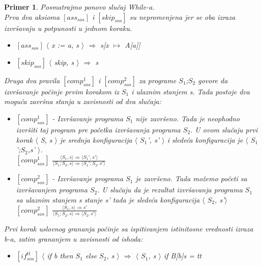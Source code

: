 \documentclass[a4paper]{article}
\newtheorem{primer}{Primer}[section]
\begin{document}
{\begin{primer} Posmatrajmo ponovo slučaj \textit{While-a}.\\
Prva dva aksioma $[ass_{sos}]$ i $[skip_{sos}]$  su nepromenjena jer se oba izraza izvršavaju u potpunosti u jednom koraku.
\begin{itemize}
	\item $[ass_{sos}]$ \hspace{1cm} $\langle$ \textit{x := a, s} $\rangle$ $\Longrightarrow$ \textit{s}[\textit{x $\mapsto$ A}[\textit{a}]]
	\item $[skip_{sos}]$ \hspace{1cm} $\langle$ skip, \textit{s} $\rangle$ $\Longrightarrow$ \textit{s}
\end{itemize} 
Druga dva pravila $[comp^{1}_{sos}]$ i $[comp^{2}_{sos}]$ za programe $S_1$;$S_2$ govore da izvršavanje počinje prvim korakom iz $S_1$ i ulaznim stanjem s. Tada postoje dva moguća završna stanja u zavisnosti od dva slučaja:
\begin{itemize}
	\item $[comp^{1}_{sos}]$ - Izvršavanje programa $S_1$ nije završeno. Tada je neophodno izvršiti taj program pre početka izvršavanja programa $S_2$. U ovom slučaju prvi korak $\langle$ \textit{S, s} $\rangle$ je srednja konfiguracija  $\langle$ \textit{$S_1$', s'} $\rangle$ i sledeća konfiguracija je  $\langle$ \textit{$S_1$';$S_2$,s'} $\rangle$.\\
	$[comp^1_{sos}]$ \hspace{1cm} {\large $\frac{\langle S_1, s \rangle \Longrightarrow \langle S_1', s' \rangle}{\langle S_1;S_2,s \rangle \Longrightarrow \langle S_1';S_2,s' \rangle}$}
	\item $[comp^2_{sos}]$ - Izvršavanje programa $S_1$  je završeno. Tada možemo početi sa izvršavanjem programa $S_2$. U slučaju da je rezultat izvršavanja programa $S_1$ sa ulaznim stanjem s stanje s' tada je sledeća konfiguracija $\langle$ $S_2$, s'$\rangle$ \\
	$[comp^2_{sos}]$ \hspace{1cm}  {\large $\frac{\langle S_1, s \rangle \Longrightarrow s'}{\langle S_1;S_2,s \rangle \Longrightarrow \langle S_2, s'\rangle}$}
\end{itemize} 
Prvi korak uslovnog grananja počinje sa ispitivanjem istinitosne vrednosti izraza \textit{b}-a, zatim grananjem u zavisnosti od ishoda:
\begin{itemize}
	\item $[if^{tt}_{sos}]$ $\langle$ if b then $S_1$ else $S_2$, s $\rangle$ $\Longrightarrow$ $\langle$ $S_1$, s $\rangle$ \hspace{1cm} if B[b]s = tt

\end{itemize}
\end{primer}}
\end{document}

